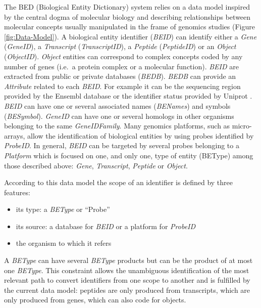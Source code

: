 \documentclass[9pt,a4paper,]{extarticle}
\theoremstyle{definition}
\theoremstyle{definition}
\theoremstyle{definition}
\theoremstyle{remark}
\begin{document}
The BED (Biological Entity Dictionary) system relies on a data model
inspired by the central dogma of
molecular biology \citep{crick_central_1970} and describing
relationships between molecular concepts
usually manipulated in the frame of genomics studies
(Figure \ref{fig:Data-Model}).
A biological entity identifier (\emph{BEID}) can identify either a \emph{Gene} (\emph{GeneID}),
a \emph{Transcript} (\emph{TranscriptID}), a \emph{Peptide} (\emph{PeptideID}) or
an \emph{Object} (\emph{ObjectID}). \emph{Object} entities can correspond to complex concepts
coded by any number of genes (i.e.~a protein complex or a molecular function).
\emph{BEID} are extracted from public or private databases (\emph{BEDB}).
\emph{BEDB} can provide an \emph{Attribute} related to each \emph{BEID}.
For example it can be the
sequencing region provided by the Ensembl database \citep{zerbino_ensembl_2017}
or the identifier
status provided by Uniprot \citep{the_uniprot_consortium_uniprot:_2017}.
\emph{BEID} can have one or several associated names (\emph{BENames}) and symbols
(\emph{BESymbol}). \emph{GeneID} can have one or several homologs in other organisms
belonging to the same \emph{GeneIDFamily}.
Many genomics platforms, such as micro-arrays, allow the identification of
biological entities by using probes identified by \emph{ProbeID}. In general,
\emph{BEID} can be targeted by several probes belonging to a \emph{Platform} which
is focused on one, and only one, type of entity (BEType) among those described
above: \emph{Gene}, \emph{Transcript}, \emph{Peptide} or \emph{Object}.

According to this data model the scope of an identifier is defined by three
features:

\begin{itemize}
\item
  its type: a \emph{BEType} or ``Probe''
\item
  its source: a database for \emph{BEID}
  or a platform for \emph{ProbeID}
\item
  the organism to which it refers
\end{itemize}

A \emph{BEType} can have several
\emph{BEType} products but can be the product of at most one \emph{BEType}.
This constraint allows the unambiguous identification of the most relevant path
to convert identifiers from one scope to another and
is fulfilled by the current data model:
peptides are only produced from transcripts, which are only produced
from genes, which can also code for objects.
\end{document}

